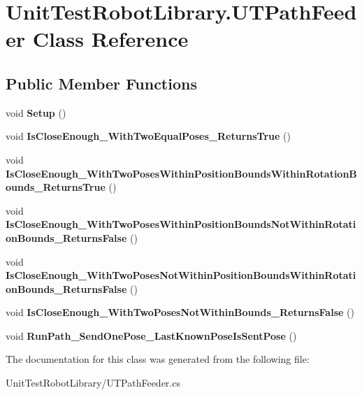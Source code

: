 \hypertarget{class_unit_test_robot_library_1_1_u_t_path_feeder}{}\section{Unit\+Test\+Robot\+Library.\+U\+T\+Path\+Feeder Class Reference}
\label{class_unit_test_robot_library_1_1_u_t_path_feeder}
\subsection*{Public Member Functions}
\begin{DoxyCompactItemize}
\item 
\hypertarget{class_unit_test_robot_library_1_1_u_t_path_feeder_a3a3a740257f117c518ea233ee05f94ad}{}\label{class_unit_test_robot_library_1_1_u_t_path_feeder_a3a3a740257f117c518ea233ee05f94ad} 
void {\bfseries Setup} ()
\item 
\hypertarget{class_unit_test_robot_library_1_1_u_t_path_feeder_a4a86c1fc0d63f595d7212746cbc84317}{}\label{class_unit_test_robot_library_1_1_u_t_path_feeder_a4a86c1fc0d63f595d7212746cbc84317} 
void {\bfseries Is\+Close\+Enough\+\_\+\+With\+Two\+Equal\+Poses\+\_\+\+Returns\+True} ()
\item 
\hypertarget{class_unit_test_robot_library_1_1_u_t_path_feeder_a15e5d454c924438c6ddcb7b1c97901ed}{}\label{class_unit_test_robot_library_1_1_u_t_path_feeder_a15e5d454c924438c6ddcb7b1c97901ed} 
void {\bfseries Is\+Close\+Enough\+\_\+\+With\+Two\+Poses\+Within\+Position\+Bounds\+Within\+Rotation\+Bounds\+\_\+\+Returns\+True} ()
\item 
\hypertarget{class_unit_test_robot_library_1_1_u_t_path_feeder_a4c35780f9c48e0e558e5db952d7db160}{}\label{class_unit_test_robot_library_1_1_u_t_path_feeder_a4c35780f9c48e0e558e5db952d7db160} 
void {\bfseries Is\+Close\+Enough\+\_\+\+With\+Two\+Poses\+Within\+Position\+Bounds\+Not\+Within\+Rotation\+Bounds\+\_\+\+Returns\+False} ()
\item 
\hypertarget{class_unit_test_robot_library_1_1_u_t_path_feeder_a8d381eb01be52b49b116183b58807e56}{}\label{class_unit_test_robot_library_1_1_u_t_path_feeder_a8d381eb01be52b49b116183b58807e56} 
void {\bfseries Is\+Close\+Enough\+\_\+\+With\+Two\+Poses\+Not\+Within\+Position\+Bounds\+Within\+Rotation\+Bounds\+\_\+\+Returns\+False} ()
\item 
\hypertarget{class_unit_test_robot_library_1_1_u_t_path_feeder_a6159cff81d134e8d4565af13912f69ff}{}\label{class_unit_test_robot_library_1_1_u_t_path_feeder_a6159cff81d134e8d4565af13912f69ff} 
void {\bfseries Is\+Close\+Enough\+\_\+\+With\+Two\+Poses\+Not\+Within\+Bounds\+\_\+\+Returns\+False} ()
\item 
\hypertarget{class_unit_test_robot_library_1_1_u_t_path_feeder_a83c78069180981be4fce87bcc15fc18c}{}\label{class_unit_test_robot_library_1_1_u_t_path_feeder_a83c78069180981be4fce87bcc15fc18c} 
void {\bfseries Run\+Path\+\_\+\+Send\+One\+Pose\+\_\+\+Last\+Known\+Pose\+Is\+Sent\+Pose} ()
\end{DoxyCompactItemize}


The documentation for this class was generated from the following file\+:\begin{DoxyCompactItemize}
\item 
Unit\+Test\+Robot\+Library/U\+T\+Path\+Feeder.\+cs\end{DoxyCompactItemize}
